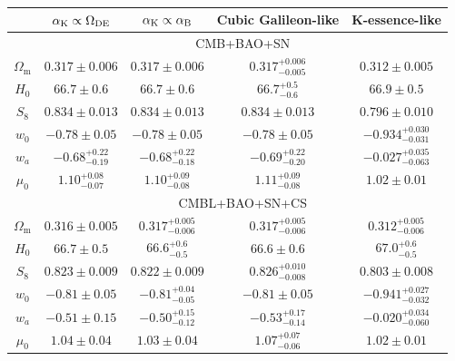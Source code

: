 \documentclass[%
reprint,
superscriptaddress,
preprint numbers,
nofootinbib,
amsmath,amssymb,
aps,
prd
]{revtex4-2}
\begin{document}
\begin{table}[]
    \centering
    \begin{tabular}{|c|c|c|c|c|}
        \hline
         & $\alpha_{\rm K} \propto \Omega_\mathrm{DE}$ & $\alpha_{\rm K} \propto \alpha_{\rm B}$ & Cubic Galileon-like & K-essence-like \\
        \hline
        & \multicolumn{4}{c|}{CMB+BAO+SN}\\
        \hline
        $\Omega_\mathrm{m}$ & $0.317 \pm 0.006$ & $0.317 \pm 0.006$ & $0.317^{+0.006}_{-0.005}$ & $0.312 \pm 0.005$ \\ \hline
        $H_0$ & $66.7 \pm 0.6$ & $66.7 \pm 0.6$ & $66.7^{+0.5}_{-0.6}$ & $66.9 \pm 0.5$ \\ \hline
        $S_8$ & $0.834 \pm 0.013$ & $0.834 \pm 0.013$ & $0.834 \pm 0.013$ & $0.796 \pm 0.010$ \\ \hline
        $w_0$ & $-0.78 \pm 0.05$ & $-0.78 \pm 0.05$ & $-0.78 \pm 0.05$ & $-0.934^{+0.030}_{-0.031}$ \\ \hline
        $w_a$ & $-0.68^{+0.22}_{-0.19}$ & $-0.68^{+0.22}_{-0.18}$ & $-0.69^{+0.22}_{-0.20}$ & $-0.027^{+0.035}_{-0.063}$ \\ \hline
        $\mu_0$ & $1.10^{+0.08}_{-0.07}$ & $1.10^{+0.09}_{-0.08}$ & $1.11^{+0.09}_{-0.08}$ & $1.02 \pm 0.01$ \\ \hline
        \hline
        & \multicolumn{4}{c|}{CMBL+BAO+SN+CS}\\
        \hline
        $\Omega_\mathrm{m}$ & $0.316 \pm 0.005$ & $0.317^{+0.005}_{-0.006}$ & $0.317^{+0.005}_{-0.006}$ & $0.312^{+0.005}_{-0.006}$ \\ \hline
        $H_0$ & $66.7 \pm 0.5$ & $66.6^{+0.6}_{-0.5}$ & $66.6 \pm 0.6$ & $67.0^{+0.6}_{-0.5}$ \\ \hline
        $S_8$ & $0.823 \pm 0.009$ & $0.822 \pm 0.009$ & $0.826^{+0.010}_{-0.008}$ & $0.803 \pm 0.008$ \\ \hline
        $w_0$ & $-0.81 \pm 0.05$ & $-0.81^{+0.04}_{-0.05}$ & $-0.81 \pm 0.05$ & $-0.941^{+0.027}_{-0.032}$ \\ \hline
        $w_a$ & $-0.51 \pm 0.15$ & $-0.50^{+0.15}_{-0.12}$ & $-0.53^{+0.17}_{-0.14}$ & $-0.020^{+0.034}_{-0.060}$ \\ \hline
        $\mu_0$ & $1.04 \pm 0.04$ & $1.03 \pm 0.04$ & $1.07^{+0.07}_{-0.06}$ & $1.02 \pm 0.01$ \\ \hline
    \end{tabular}
    \caption{}
    \label{tab:qsa_constraints}
\end{table}
\end{document}
